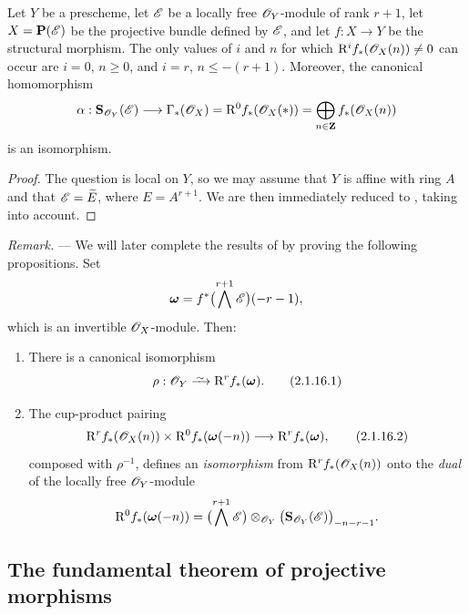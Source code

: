 \begin{proposition}[2.1.15]
\label{III.2.1.15}
Let $Y$ be a prescheme, let $\mathscr{E}$ be a locally free $\mathscr{O}_Y$-module of rank $r+1$, let $X=\mathbf{P}(\mathscr{E})$ be the projective bundle defined by $\mathscr{E}$, and let $f:X\to Y$ be the structural morphism.
The only values of $i$ and $n$ for which $\mathrm{R}^if_*(\mathscr{O}_X(n))\neq0$ can occur are $i=0$, $n\geq0$, and $i=r$, $n\leq-(r+1)$.
Moreover, the canonical homomorphism 
\[
  \alpha:\mathbf{S}_{\mathscr{O}_Y}(\mathscr{E})
  \longrightarrow \Gamma_*(\mathscr{O}_X)
  =\mathrm{R}^0f_*(\mathscr{O}_X(*))
  =\bigoplus_{n\in\mathbf{Z}}f_*(\mathscr{O}_X(n))
\]
is an isomorphism.
\end{proposition}

\begin{proof}
The question is local on $Y$, so we may assume that $Y$ is affine with ring $A$ and that $\mathscr{E}=\widetilde{E}$, where $E=A^{r+1}$.
We are then immediately reduced to , taking  into account.
\end{proof}

\begin{env}[2.1.16]
\label{III.2.1.16}
\emph{Remark.} ---
We will later complete the results of  by proving the following propositions.
Set
\[
  \boldsymbol{\omega}=f^*\bigl(\bigwedge^{r+1}\mathscr{E}\bigr)(-r-1),
\]
which is an invertible $\mathscr{O}_X$-module.
Then:
\begin{enumerate}
  \item[{\rm(i)}] There is a canonical isomorphism
  \[
  \label{III.2.1.16.1}
    \rho:\sh{O}_Y \simto \RR^rf_*(\boldsymbol{\omega}).
    \tag{2.1.16.1}
  \]
  \item[{\rm(ii)}] The cup-product pairing 
  \[
  \label{III.2.1.16.2}
    \mathrm{R}^rf_*(\mathscr{O}_X(n))
    \times \mathrm{R}^0f_*(\boldsymbol{\omega}(-n))
    \longrightarrow \mathrm{R}^rf_*(\boldsymbol{\omega}),
    \tag{2.1.16.2}
  \]
  composed with $\rho^{-1}$, defines an \emph{isomorphism} from $\mathrm{R}^rf_*(\mathscr{O}_X(n))$ onto the \emph{dual} of the locally free $\mathscr{O}_Y$-module
  \[
    \mathrm{R}^0f_*(\boldsymbol{\omega}(-n))
    =\bigl(\bigwedge^{r+1}\mathscr{E}\bigr)
      \otimes_{\mathscr{O}_Y}
      \bigl(\mathbf{S}_{\mathscr{O}_Y}(\mathscr{E})\bigr)_{-n-r-1}.
  \]
\end{enumerate}
\end{env}

\subsection{The fundamental theorem of projective morphisms}
\label{subsection:III.2.2}


